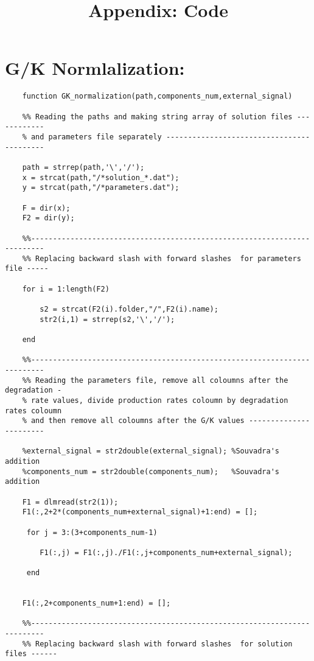 \documentclass{article}
\title{Appendix: Code}
\begin{document}
\maketitle %
\section*{G/K Normlalization:}
\begin{verbatim}
    function GK_normalization(path,components_num,external_signal)

    %% Reading the paths and making string array of solution files ------------
    % and parameters file separately ------------------------------------------
    
    path = strrep(path,'\','/');
    x = strcat(path,"/*solution_*.dat");
    y = strcat(path,"/*parameters.dat");
    
    F = dir(x);
    F2 = dir(y);
    
    %%-------------------------------------------------------------------------
    %% Replacing backward slash with forward slashes  for parameters file -----
    
    for i = 1:length(F2)
        
        s2 = strcat(F2(i).folder,"/",F2(i).name);
        str2(i,1) = strrep(s2,'\','/');
        
    end
    
    %%-------------------------------------------------------------------------
    %% Reading the parameters file, remove all coloumns after the degradation -
    % rate values, divide production rates coloumn by degradation rates coloumn
    % and then remove all coloumns after the G/K values -----------------------
    
    %external_signal = str2double(external_signal); %Souvadra's addition
    %components_num = str2double(components_num);   %Souvadra's addition
    
    F1 = dlmread(str2(1));
    F1(:,2+2*(components_num+external_signal)+1:end) = [];
    
     for j = 3:(3+components_num-1)
                   
        F1(:,j) = F1(:,j)./F1(:,j+components_num+external_signal);
        
     end
     
     
    F1(:,2+components_num+1:end) = [];
    
    %%-------------------------------------------------------------------------
    %% Replacing backward slash with forward slashes  for solution files ------
    

\end{verbatim}
\end{document}
